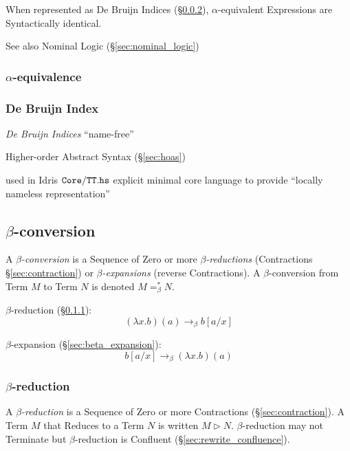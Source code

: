 When represented as De Bruijn Indices (\S\ref{sec:debruijn_index}),
$\alpha$-equivalent Expressions are Syntactically identical.

\fist See also Nominal Logic (\S\ref{sec:nominal_logic})



\subsubsection{$\alpha$-equivalence}\label{sec:alpha_equivalence}

\subsubsection{De Bruijn Index}\label{sec:debruijn_index}

\emph{De Bruijn Indices} ``name-free''

Higher-order Abstract Syntax (\S\ref{sec:hoas})

used in Idris $\mathtt{Core/TT.hs}$ explicit minimal core language to
provide ``locally nameless representation''



\subsection{$\beta$-conversion}\label{sec:beta_conversion}
\cite{seldin03}

A \emph{$\beta$-conversion} is a Sequence of Zero or more
\emph{$\beta$-reductions} (Contractions \S\ref{sec:contraction}) or
\emph{$\beta$-expansions} (reverse Contractions). A $\beta$-conversion
from Term $M$ to Term $N$ is denoted $M =_\beta^* N$.

$\beta$-reduction (\S\ref{sec:beta_reduction}):
\[
  (\lambda x.b)(a) \rightarrow_\beta b[a/x]
\]

$\beta$-expansion (\S\ref{sec:beta_expansion}):
\[
  b[a/x] \rightarrow_\beta (\lambda x.b)(a)
\]



\subsubsection{$\beta$-reduction}\label{sec:beta_reduction}

A \emph{$\beta$-reduction} is a Sequence of Zero or more Contractions
(\S\ref{sec:contraction}). A Term $M$ that Reduces to a Term $N$ is
written $M \rhd N$. $\beta$-reduction may not Terminate but
$\beta$-reduction is Confluent (\S\ref{sec:rewrite_confluence}).

